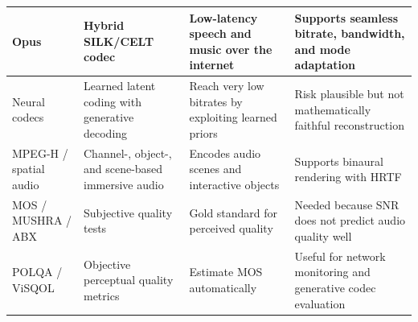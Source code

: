 \begin{center}
\begin{tabular}{|l|l|l|l|}
Opus & Hybrid SILK/CELT codec & Low-latency speech and music over the internet & Supports seamless bitrate, bandwidth, and mode adaptation \\ \hline
Neural codecs & Learned latent coding with generative decoding & Reach very low bitrates by exploiting learned priors & Risk plausible but not mathematically faithful reconstruction \\ \hline
MPEG-H / spatial audio & Channel-, object-, and scene-based immersive audio & Encodes audio scenes and interactive objects & Supports binaural rendering with HRTF \\ \hline
MOS / MUSHRA / ABX & Subjective quality tests & Gold standard for perceived quality & Needed because SNR does not predict audio quality well \\ \hline
POLQA / ViSQOL & Objective perceptual quality metrics & Estimate MOS automatically & Useful for network monitoring and generative codec evaluation \\ \hline
\end{tabular}
\end{center}

